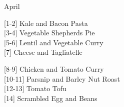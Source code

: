 		\begin{menu}{April}
    
    \begin{recipelist}
    
        {\scriptsize[1-2]} Kale and Bacon Pasta\\
        {\scriptsize[3-4]} Vegetable Shepherds Pie\\
        {\scriptsize[5-6]} Lentil and Vegetable Curry\\
        {\scriptsize[7]} Cheese and Tagliatelle\\%
    \end{recipelist}%
    \begin{recipelist}
    
        {\scriptsize[8-9]} Chicken and Tomato Curry\\
        {\scriptsize[10-11]} Parsnip and Barley Nut Roast\\
        {\scriptsize[12-13]} Tomato Tofu\\
        {\scriptsize[14]} Scrambled Egg and Beans\\%
    \end{recipelist}\par%
  

\end{menu}
